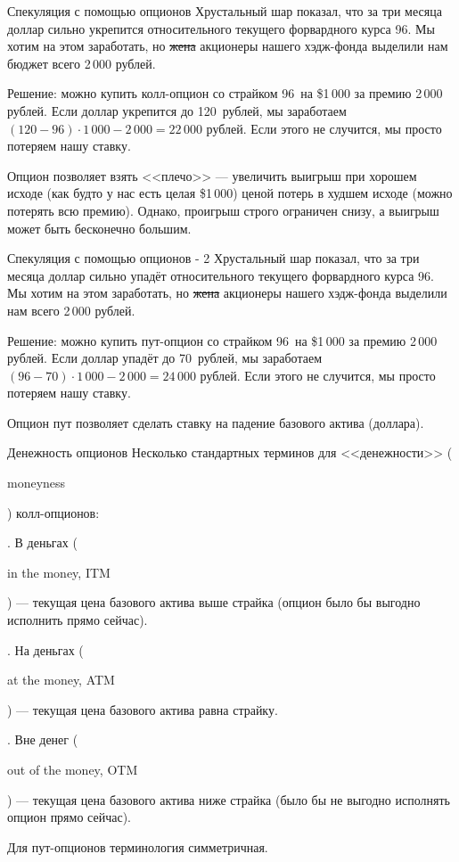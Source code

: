 \documentclass{beamer}
\newcommand{\en}[1]{\begin{otherlanguage}{english}#1\end{otherlanguage}}
\newcommand{\usdrubstrike}{96}
\newcommand{\usdrublow}{70}
\newcommand{\usdrubhigh}{120}
\newcommand{\highminusstrikepremium}{22}
\newcommand{\strikeminuslowpremium}{24}
\begin{document}
\begin{frame}{Спекуляция с помощью опционов}
\justify
Хрустальный шар показал, что за три месяца доллар сильно укрепится относительного текущего форвардного курса \usdrubstrike. Мы хотим на этом заработать, но \sout{жена} акционеры нашего хэдж-фонда выделили нам бюджет всего 2\,000 рублей.

\justify
Решение: можно купить колл-опцион со страйком \usdrubstrike\ на \$1\,000 за премию 2\,000 рублей. Если доллар укрепится до \usdrubhigh\ рублей, мы заработаем $(\usdrubhigh - \usdrubstrike) \cdot 1\,000 - 2\,000 = \highminusstrikepremium\,000$ рублей. Если этого не случится, мы просто потеряем нашу ставку.

\justify
Опцион позволяет взять <<плечо>> --- увеличить выигрыш при хорошем исходе (как будто у нас есть целая \$1\,000) ценой потерь в худшем исходе (можно потерять всю премию). Однако, проигрыш строго ограничен снизу, а выигрыш может быть бесконечно большим.
\end{frame}



\begin{frame}{Спекуляция с помощью опционов - 2}
\justify
Хрустальный шар показал, что за три месяца доллар сильно упадёт относительного текущего форвардного курса \usdrubstrike. Мы хотим на этом заработать, но \sout{жена} акционеры нашего хэдж-фонда выделили нам всего 2\,000 рублей.

\justify
Решение: можно купить пут-опцион со страйком \usdrubstrike\ на \$1\,000 за премию 2\,000 рублей. Если доллар упадёт до \usdrublow\ рублей, мы заработаем $(\usdrubstrike - \usdrublow) \cdot 1\,000 - 2\,000 = \strikeminuslowpremium\,000$ рублей. Если этого не случится, мы просто потеряем нашу ставку.

\justify
Опцион пут позволяет сделать ставку на падение базового актива (доллара).
\end{frame}



\begin{frame}{Денежность опционов}
\justify
Несколько стандартных терминов для <<денежности>> (\en{moneyness}) колл-опционов:

. В деньгах (\en{in the money, ITM}) --- текущая цена базового актива выше страйка (опцион было бы выгодно исполнить прямо сейчас).

. На деньгах (\en{at the money, ATM}) --- текущая цена базового актива равна страйку.

. Вне денег (\en{out of the money, OTM}) --- текущая цена базового актива ниже страйка (было бы не выгодно исполнять опцион прямо сейчас).

\justify
Для пут-опционов терминология симметричная.
\end{frame}
\end{document}
